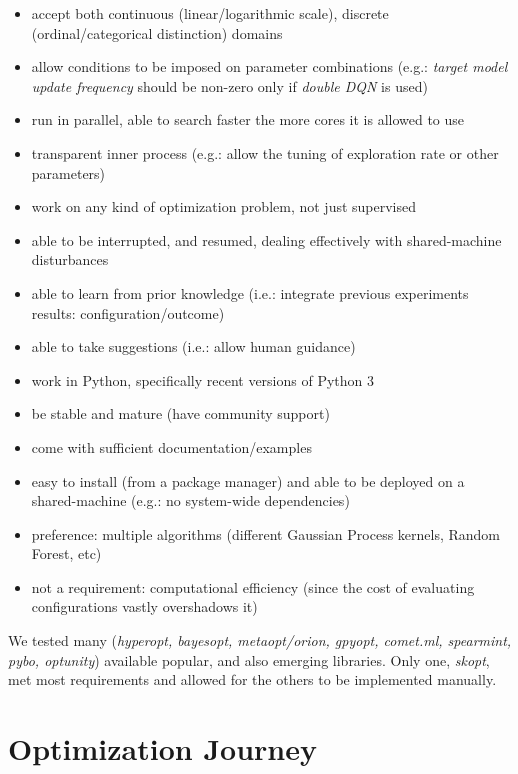 \documentclass{article}
\begin{document}
\begin{itemize}
  \item accept both continuous (linear/logarithmic scale), discrete (ordinal/categorical distinction) domains
  \item allow conditions to be imposed on parameter combinations (e.g.: \textit{target model update frequency} should be non-zero only if \textit{double DQN} is used)
  \item run in parallel, able to search faster the more cores it is allowed to use
  \item transparent inner process (e.g.: allow the tuning of exploration rate or other parameters)
  \item work on any kind of optimization problem, not just supervised

  \item able to be interrupted, and resumed, dealing effectively with shared-machine disturbances
  \item able to learn from prior knowledge (i.e.: integrate previous experiments results: configuration/outcome)
  \item able to take suggestions (i.e.: allow human guidance)
  \item work in Python, specifically recent versions of Python 3
  \item be stable and mature (have community support)
  \item come with sufficient documentation/examples
  \item easy to install (from a package manager) and able to be deployed on a shared-machine (e.g.: no system-wide dependencies)


  \item preference: multiple algorithms (different Gaussian Process kernels, Random Forest, etc)
  \item not a requirement: computational efficiency (since the cost of evaluating configurations vastly overshadows it)
\end{itemize}

We tested many (\textit{hyperopt, bayesopt, metaopt/orion, gpyopt, comet.ml, spearmint, pybo, optunity}) available popular, and also emerging libraries. Only one, \textit{skopt}, met most requirements and allowed for the others to be implemented manually.


\newpage
\section{Optimization Journey}
\label{sec:journey}
\end{document}
